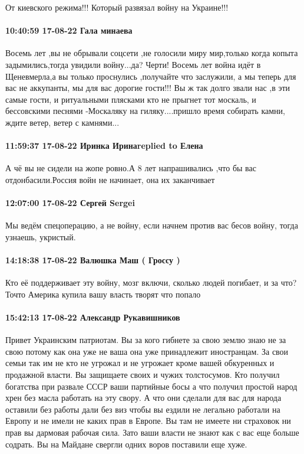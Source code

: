 От киевского режима!!! Который развязал войну на Украине!!!

\paragraph{10:40:59 17-08-22 Гала минаева}

Восемь лет ,вы не обрывали соцсети ,не голосили миру мир,только когда копыта
задымились,тогда увидили войну...да? Черти! Восемь лет война идёт в
Щеневмерла,а вы только проснулись ,получайте что заслужили, а мы теперь для вас
не аккупанты, мы для вас дорогие гости!!! Вы ж так долго звали нас ,в эти самые
гости, и ритуальными плясками кто не прыгнет тот москаль, и бессовскими песнями
-Москаляку на гиляку....пришло время собирать камни, ждите ветер, ветер с
камнями...

\paragraph{11:59:37 17-08-22 Иринка Иринаreplied to Елена}

А чё вы не сидели на жопе ровно.А 8 лет напрашивались ,что бы вас
отдонбасили.Россия войн не начинает, она их заканчивает

\paragraph{12:07:00 17-08-22 Сергей Sergei}

Мы ведём спецоперацию, а не войну, если начнем против вас бесов войну, тогда
узнаешь, укристый.

\paragraph{14:18:38 17-08-22 Валюшка Маш ( Гроссу )}

Кто её поддерживает эту войну, мозг включи, сколько людей погибает, и за что?
Точто Америка купила вашу власть творят что попало

\paragraph{15:42:13 17-08-22 Александр Рукавишников}

Привет Украинским патриотам. Вы за кого гибнете за свою землю знаю не за свою
потому как она уже не ваша она уже принадлежит иностранцам. За свои семьи так
им не кто не угрожал и не угрожает кроме вашей обкуренных и продажной власти.
Вы защищаете своих и чужих толстосумов. Кто получил богатства при развале СССР
ваши партийные босы а что получил простой народ хрен без масла работать на эту
свору. А что они сделали для вас для народа оставили без работы дали без виз
чтобы вы ездили не легально работали на Европу и не имели не каких прав в
Европе. Вы там не имеете ни страховок ни прав вы дармовая рабочая сила. Зато
ваши власти не знают как с вас еще больше содрать. Вы на Майдане свергли одних
воров поставили еще хуже.

